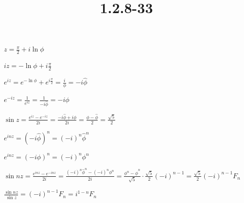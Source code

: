 \documentclass{article}
\title{1.2.8-33}
\begin{document}
\maketitle

$z = \frac{\pi}{2} + i \ln \phi$

$iz = -\ln\phi + i\frac{\pi}{2}$

$e^{iz} = e^{-\ln\phi} + e^{i\frac{\pi}{2}} = \frac{i}{\phi} = -i\hat{\phi}$

$e^{-iz} = \frac{1}{e^{iz}} = \frac{1}{-i\hat{\phi}} = -i\phi$

$\sin z = \frac{e^{iz} - e^{-iz}}{2i} = \frac{-i\hat{\phi} + i\phi}{2i} = \frac{\phi - \hat{\phi}}{2} = \frac{\sqrt{5}}{2}$

$e^{inz} = (-i\hat{\phi})^n = (-i)^n\hat{\phi}^n$

$e^{inz} = (-i\phi)^n = (-i)^n\phi^n$

$\sin nz = \frac{e^{inz} - e^{-inz}}{2i} = \frac{(-i)^n\hat{\phi}^n - (-i)^n\phi^n}{2i} = \frac{\phi^n - \hat{\phi}^n}{\sqrt{5}}\cdot\frac{\sqrt{5}}{2}(-i)^{n-1} = \frac{\sqrt{5}}{2} (-i)^{n-1} F_n$

$\frac{\sin nz}{\sin z} = (-i)^{n-1}F_n = i^{1-n}F_n$
\end{document}

